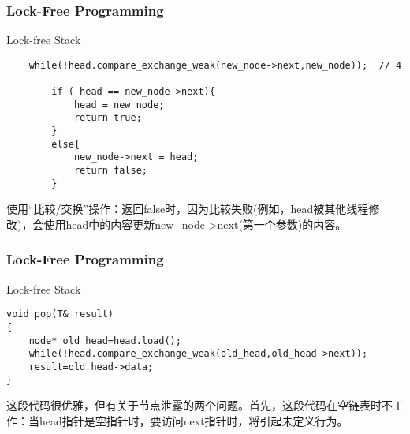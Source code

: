 \begin{frame}[fragile]
    \frametitle{Lock-Free Programming}
    \LARGE
    Lock-free Stack
    \normalsize    
    \begin{block}{}
        \begin{verbatim}
    while(!head.compare_exchange_weak(new_node->next,new_node));  // 4
        
        if ( head == new_node->next){
            head = new_node;
            return true;
        }
        else{
            new_node->next = head;
            return false;
        }
        \end{verbatim}
    \end{block}
    使用“比较/交换”操作：返回false时，因为比较失败(例如，head被其他线程修改)，会使用head中的内容更新new\_node->next(第一个参数)的内容。
\end{frame}


\begin{frame}[fragile]
    \frametitle{Lock-Free Programming}
    \LARGE
    Lock-free Stack
    \normalsize    
    \begin{block}{}
        \begin{verbatim}
void pop(T& result)
{
    node* old_head=head.load();
    while(!head.compare_exchange_weak(old_head,old_head->next));
    result=old_head->data;
}
        \end{verbatim}
    \end{block}
这段代码很优雅，但有关于节点泄露的两个问题。首先，这段代码在空链表时不工作：当head指针是空指针时，要访问next指针时，将引起未定义行为。

\end{frame}


